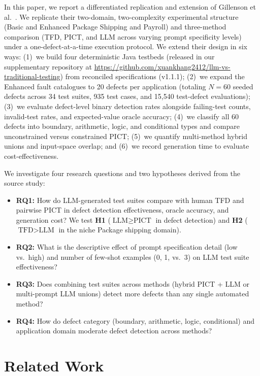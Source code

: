 \documentclass[acmsmall]{acmart}
\begin{document}
In this paper, we report a differentiated replication and extension of Gillenson et al.~\cite{Gillenson2026}. We replicate their two-domain, two-complexity experimental structure (Basic and Enhanced Package Shipping and Payroll) and three-method comparison (TFD, PICT, and LLM across varying prompt specificity levels) under a one-defect-at-a-time execution protocol. We extend their design in six ways: (1)~we build four deterministic Java testbeds (released in our supplementary repository at \url{https://github.com/xuankhang2412/llm-vs-traditional-testing}) from reconciled specifications (v1.1.1); (2)~we expand the Enhanced fault catalogues to 20 defects per application (totaling $N=60$ seeded defects across 34 test suites, 935 test cases, and 15,540 test-defect evaluations); (3)~we evaluate defect-level binary detection rates alongside failing-test counts, invalid-test rates, and expected-value oracle accuracy; (4)~we classify all 60 defects into boundary, arithmetic, logic, and conditional types and compare unconstrained versus constrained PICT; (5)~we quantify multi-method hybrid unions and input-space overlap; and (6)~we record generation time to evaluate cost-effectiveness.

We investigate four research questions and two hypotheses derived from the source study:
\begin{itemize}
  \item \textbf{RQ1:} How do LLM-generated test suites compare with human TFD and pairwise PICT in defect detection effectiveness, oracle accuracy, and generation cost? We test \textbf{H1} ($\text{LLM} \ge \text{PICT}$ in defect detection) and \textbf{H2} ($\text{TFD} > \text{LLM}$ in the niche Package shipping domain).
  \item \textbf{RQ2:} What is the descriptive effect of prompt specification detail (low vs.\ high) and number of few-shot examples (0, 1, vs.\ 3) on LLM test suite effectiveness?
  \item \textbf{RQ3:} Does combining test suites across methods (hybrid PICT + LLM or multi-prompt LLM unions) detect more defects than any single automated method?
  \item \textbf{RQ4:} How do defect category (boundary, arithmetic, logic, conditional) and application domain moderate defect detection across methods?
\end{itemize}

\section{Related Work}
\label{sec:related}
\end{document}
